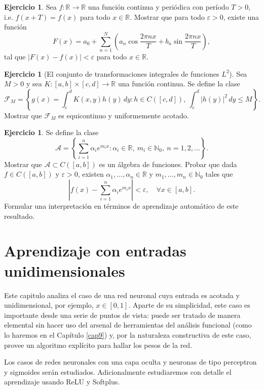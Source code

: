 \documentclass[12pt, a4paper]{amsbook}
\newcommand{\ve}{\varepsilon}
\newcommand{\R}{{\mathbb R}}
\newcommand{\N}{{\mathbb N}}
\newcommand{\F}{{\mathcal F}}
\newcommand{\A}{{\mathcal A}}
\theoremstyle{remark}
\theoremstyle{definition}
\newtheorem{ejer}[teo]{Ejercicio}
\numberwithin{section}{chapter}
\numberwithin{subsection}{section}
\numberwithin{equation}{section}
\numberwithin{figure}{chapter}
\begin{document}
\begin{ejer}\label{ej.7.11.7}
Sea $f\colon\R\to\R$ una función continua y periódica con período $T>0$, i.e. $f(x+T)=f(x)$ para todo $x\in\R$. Mostrar que para todo $\ve>0$, existe una función
$$
F(x) = a_0 + \sum_{n=1}^N \left(a_n\cos\frac{2\pi nx}{T} + b_n \sin\frac{2\pi nx}{T}\right),
$$
tal que $|F(x)-f(x)|<\ve$ para todo $x\in \R$.
\end{ejer}

\begin{ejer}[El conjunto de transformaciones integrales de funciones $L^2$]\label{ej.7.11.10}
Sea $M>0$ y sea $K\colon [a, b]\times [c, d]\to \R$ una función continua. Se define la clase
$$
\F_M = \left\{ g(x) = \int_c^d K(x, y)h(y)\, dy\colon h\in C([c, d]),\ \int_c^d |h(y)|^2\, dy \le M\right\}.
$$
Mostrar que $\F_M$ es equicontinuo y uniformemente acotado.
\end{ejer}

\begin{ejer}
Se define la clase
$$
\A = \left\{\sum_{i=1}^n \alpha_i e^{m_i x}\colon \alpha_i\in\R,\ m_i\in\N_0,\ n=1,2,\dots\right\}.
$$
Mostrar que $\A\subset C([a, b])$ es un álgebra de funciones. Probar que dada $f\in C([a, b])$ y $\ve>0$, existen $\alpha_1,\dots,\alpha_n\in\R$ y $m_1,\dots,m_n\in\N_0$ tales que
$$
\left| f(x) - \sum_{i=1}^n \alpha_i e^{m_i x}\right| < \ve,\quad \forall x\in [a, b].
$$
Formular una interpretación en términos de aprendizaje automático de este resultado.
\end{ejer}


\chapter{Aprendizaje con entradas unidimensionales}\label{cap8}

Este capitulo analiza el caso de una red neuronal cuya entrada es acotada y unidimensional, por ejemplo, $x\in[0, 1]$. Aparte de su simplicidad, este caso es importante desde una serie de puntos de vista: puede ser tratado de manera elemental sin hacer uso del arsenal de herramientas del análisis funcional (como lo haremos en el Capítulo \ref{cap9}) y, por la naturaleza constructiva de este caso, provee un algoritmo explícito para hallar los pesos de la red.

Los casos de redes neuronales con una capa oculta y neuronas de tipo perceptron y sigmoides serán estudiados. Adicionalmente estudiaremos con detalle el aprendizaje usando ReLU y Softplus.
\end{document}
